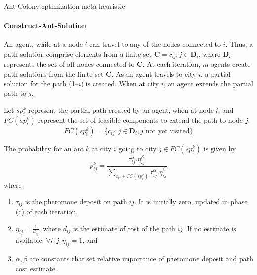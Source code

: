 \begin{algorithm}[H]
        \SetAlgoLined
        \DontPrintSemicolon
        \caption{Ant Colony optimization meta-heuristic}
        \label{algo:agents:ant}
\end{algorithm}

\paragraph{Construct-Ant-Solution}
An agent, while at a node $i$ can travel to any of the nodes connected to $i$. Thus, a path solution comprise elements
from a finite set $\mathbf{C} = c_{ij}: j \in \mathbf{D}_i$, where $\mathbf{D}_i$ represents the set of all nodes connected to 
$\mathbf{C}$. At each iteration, $m$ agents create path solutions from the finite set $\mathbf{C}$. As an agent travels to city 
$i$, a partial solution for the path (1--$i$) is created. When at city $i$, an agent extends the partial path to $j$. 

\noindent
Let $sp_i^k$ represent the partial path created by an agent, when at node $i$, and $FC(ap_i^k)$ represent the set of feasible 
components to extend the path to node $j$.
\begin{equation}
	FC(sp_i^k) = \{ c_{ij}: j \in \mathbf{D}_i, j \text{ not yet visited} \}
\end{equation}

\noindent
The probability for an ant $k$ at city $i$ going to city $j \in FC(sp_i^k)$ is given by
\begin{equation}
	p_{ij}^k = \frac{\tau_{ij}^\alpha . \eta_{ij}^\beta}
		{\sum_{c_{ij} \in FC(sp_i^k)} \tau_{ij}^\alpha . \eta_{ij}^\beta}
\end{equation}
\noindent
where 
\begin{enumerate}
	\item $\tau_{ij}$ is the pheromone deposit on path $ij$. It is initially zero, updated in phase (c) of each iteration,
	\item $\eta_{ij} = \frac{1}{d_{ij}}$, where $d_{ij}$ is the estimate of cost of the path $ij$. If no estimate is available, 
		$\forall i,j: \eta_{ij} = 1$, and 
	\item $\alpha, \beta$ are constants that set relative importance of pheromone deposit and path cost estimate.
\end{enumerate}

